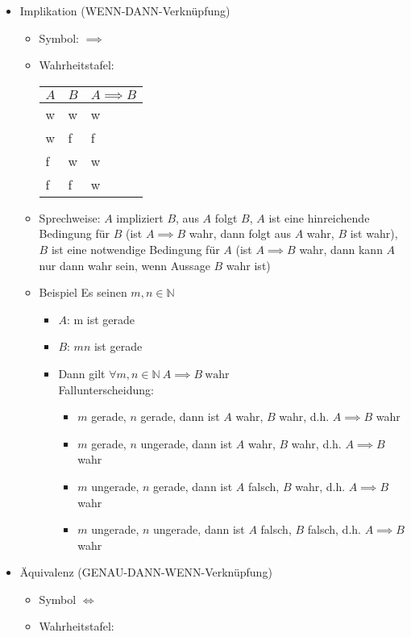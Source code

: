 \documentclass[a4paper]{scrartcl}
\DeclareMathOperator{\Forall}{\forall}
\theoremstyle{definition}
\theoremstyle{plain}
\theoremstyle{plain}
\theoremstyle{remark}
\theoremstyle{remark}
\theoremstyle{remark}
\theoremstyle{remark}
\theoremstyle{remark}
\begin{document}
\begin{itemize}
\item Implikation (WENN-DANN-Verknüpfung)
\begin{itemize}
\item Symbol: $\implies$
\item Wahrheitstafel:
\begin{center}
\begin{tabular}{lll}
$A$ & $B$ & $A\implies B$\\
\hline
w & w & w\\
w & f & f\\
f & w & w\\
f & f & w\\
\end{tabular}
\end{center}
\item Sprechweise: $A$ impliziert $B$, aus $A$ folgt $B$, $A$ ist eine hinreichende Bedingung für $B$ (ist $A\implies B$ wahr, dann folgt aus $A$ wahr, $B$ ist wahr), $B$ ist eine notwendige Bedingung für $A$ (ist $A\implies B$ wahr, dann kann $A$ nur dann wahr sein, wenn Aussage $B$ wahr ist)
\item Beispiel Es seinen $m,n\in\mathbb{N}$
\begin{itemize}
\item $A$: m ist gerade
\item $B$: $mn$ ist gerade
\item Dann gilt $\Forall m,n \in\mathbb{N}~A\implies B~\text{wahr}$ \\
                 Fallunterscheidung:
\begin{itemize}
\item $m$ gerade, $n$ gerade, dann ist $A$ wahr, $B$ wahr, d.h. $A\implies B$ wahr
\item $m$ gerade, $n$ ungerade, dann ist $A$ wahr, $B$ wahr, d.h. $A\implies B$ wahr
\item $m$ ungerade, $n$ gerade, dann ist $A$ falsch, $B$ wahr, d.h. $A\implies B$ wahr
\item $m$ ungerade, $n$ ungerade, dann ist $A$ falsch, $B$ falsch, d.h. $A\implies B$ wahr
\end{itemize}
\end{itemize}
\end{itemize}
\item Äquivalenz (GENAU-DANN-WENN-Verknüpfung)
\begin{itemize}
\item Symbol $\iff$
\item Wahrheitstafel:
\begin{center}

\end{center}
\end{itemize}
\end{itemize}
\end{document}
